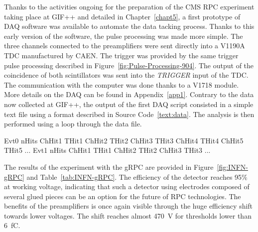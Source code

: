     Thanks to the activities ongoing for the preparation of the CMS RPC experiment taking place at GIF++ and detailed in Chapter~\ref{chapt5}, a first prototype of DAQ software was available to automate the data tacking process. Thanks to this early version of the software, the pulse processing was made more simple. The three channels connected to the preamplifiers were sent directly into a V1190A TDC manufactured by CAEN. The trigger was provided by the same trigger pulse processing described in Figure~\ref{fig:Pulse-Processing-904}. The output of the coincidence of both scintillators was sent into the \textit{TRIGGER} input of the TDC. The communication with the computer was done thanks to a V1718 module. More details on the DAQ can be found in Appendix~\ref{app1}. Contrary to the data now collected at GIF++, the output of the first DAQ script consisted in a simple text file using a format described in Source Code~\ref{text:data}. The analysis is then performed using a loop through the data file.
    
    \begin{code}
    \vspace{5mm}
    \begin{textcode}
Evt0	nHits
ChHit1	THit1
ChHit2	THit2
ChHit3	THit3
ChHit4	THit4
ChHit5	THit5
...
Evt1	nHits
ChHit1	THit1
ChHit2	THit2
ChHit3	THit3
...
    \end{textcode}
	\label{text:data}
	\vspace{5mm}
    \end{code}
    
    The results of the experiment with the gRPC are provided in Figure~\ref{fig:INFN-gRPC} and Table~\ref{tab:INFN-gRPC}. The efficiency of the detector reaches 95\% at working voltage, indicating that such a detector using electrodes composed of several glued pieces can be an option for the future of RPC technologies. The benefits of the preamplifiers is once again visible through the huge efficiency shift towards lower voltages. The shift reaches almost \SI{470}{V} for thresholds lower than \SI{6}{fC}.
    
